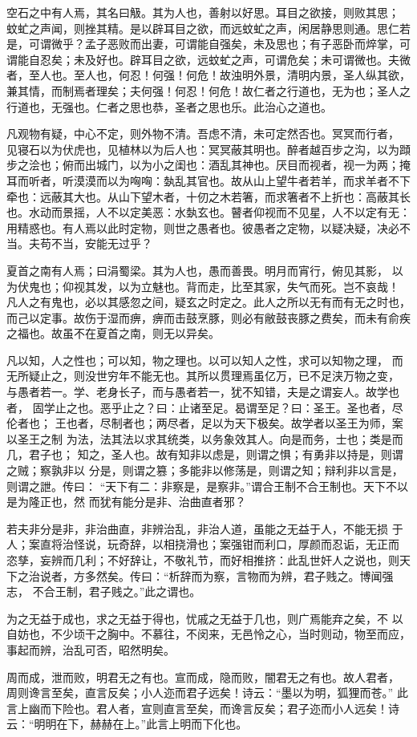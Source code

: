 空石之中有人焉，其名曰觙。其为人也，善射以好思。耳目之欲接，则败其思； 蚊虻之声闻，则挫其精。是以辟耳目之欲，而远蚊虻之声，闲居静思则通。思仁若 是，可谓微乎？孟子恶败而出妻，可谓能自强矣，未及思也；有子恶卧而焠掌，可 谓能自忍矣；未及好也。辟耳目之欲，远蚊虻之声，可谓危矣；未可谓微也。夫微 者，至人也。至人也，何忍！何强！何危！故浊明外景，清明内景，圣人纵其欲， 兼其情，而制焉者理矣；夫何强！何忍！何危！故仁者之行道也，无为也；圣人之 行道也，无强也。仁者之思也恭，圣者之思也乐。此治心之道也。

凡观物有疑，中心不定，则外物不清。吾虑不清，未可定然否也。冥冥而行者， 见寝石以为伏虎也，见植林以为后人也：冥冥蔽其明也。醉者越百步之沟，以为蹞 步之浍也；俯而出城门，以为小之闺也：酒乱其神也。厌目而视者，视一为两；掩 耳而听者，听漠漠而以为哅哅：埶乱其官也。故从山上望牛者若羊，而求羊者不下 牵也：远蔽其大也。从山下望木者，十仞之木若箸，而求箸者不上折也：高蔽其长 也。水动而景摇，人不以定美恶：水埶玄也。瞽者仰视而不见星，人不以定有无： 用精惑也。有人焉以此时定物，则世之愚者也。彼愚者之定物，以疑决疑，决必不 当。夫苟不当，安能无过乎？

夏首之南有人焉；曰涓蜀梁。其为人也，愚而善畏。明月而宵行，俯见其影， 以为伏鬼也；仰视其发，以为立魅也。背而走，比至其家，失气而死。岂不哀哉！ 凡人之有鬼也，必以其感忽之间，疑玄之时定之。此人之所以无有而有无之时也， 而己以定事。故伤于湿而痹，痹而击鼓烹豚，则必有敝鼓丧豚之费矣，而未有俞疾 之福也。故虽不在夏首之南，则无以异矣。

凡以知，人之性也；可以知，物之理也。以可以知人之性，求可以知物之理， 而无所疑止之，则没世穷年不能无也。其所以贯理焉虽亿万，已不足浃万物之变， 与愚者若一。学、老身长子，而与愚者若一，犹不知错，夫是之谓妄人。故学也者， 固学止之也。恶乎止之？曰：止诸至足。曷谓至足？曰：圣王。圣也者，尽伦者也； 王也者，尽制者也；两尽者，足以为天下极矣。故学者以圣王为师，案以圣王之制 为法，法其法以求其统类，以务象效其人。向是而务，士也；类是而几，君子也； 知之，圣人也。故有知非以虑是，则谓之惧；有勇非以持是，则谓之贼；察孰非以 分是，则谓之篡；多能非以修荡是，则谓之知；辩利非以言是，则谓之詍。传曰： “天下有二：非察是，是察非。”谓合王制不合王制也。天下不以是为隆正也，然 而犹有能分是非、治曲直者邪？

若夫非分是非，非治曲直，非辨治乱，非治人道，虽能之无益于人，不能无损 于人；案直将治怪说，玩奇辞，以相挠滑也；案强钳而利口，厚颜而忍诟，无正而 恣孳，妄辨而几利；不好辞让，不敬礼节，而好相推挤：此乱世奸人之说也，则天 下之治说者，方多然矣。传曰：“析辞而为察，言物而为辨，君子贱之。博闻强志， 不合王制，君子贱之。”此之谓也。

为之无益于成也，求之无益于得也，忧戚之无益于几也，则广焉能弃之矣，不 以自妨也，不少顷干之胸中。不慕往，不闵来，无邑怜之心，当时则动，物至而应， 事起而辨，治乱可否，昭然明矣。

周而成，泄而败，明君无之有也。宣而成，隐而败，闇君无之有也。故人君者， 周则谗言至矣，直言反矣；小人迩而君子远矣！诗云：“墨以为明，狐狸而苍。” 此言上幽而下险也。君人者，宣则直言至矣，而谗言反矣；君子迩而小人远矣！诗 云：“明明在下，赫赫在上。”此言上明而下化也。

